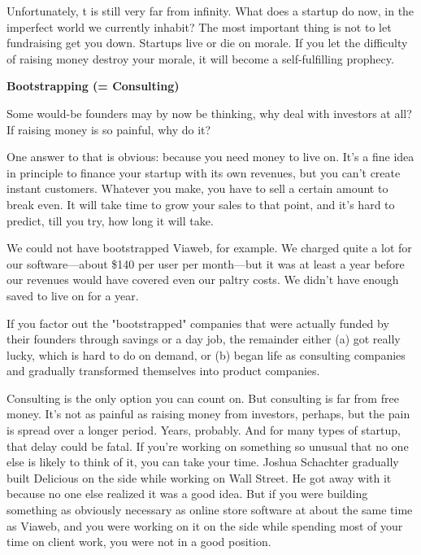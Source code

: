 Unfortunately,
                    t is still very far from infinity. What does a startup do
                    now, in the imperfect world we currently inhabit? The most
                    important thing is not to let fundraising get you down.
                    Startups live or die on morale. If you let the difficulty of
                    raising money destroy your morale, it will become a
                    self-fulfilling prophecy.


                    \textbf{Bootstrapping (= Consulting)}

Some would-be
                    founders may by now be thinking, why deal with investors at
                    all? If raising money is so painful, why do it?

One
                    answer to that is obvious: because you need money to live
                    on. It's a fine idea in principle to finance your startup
                    with its own revenues, but you can't create instant
                    customers. Whatever you make, you have to sell a certain
                    amount to break even. It will take time to grow your sales
                    to that point, and it's hard to predict, till you try, how
                    long it will take.

We could not have bootstrapped
                    Viaweb, for example. We charged quite a lot for our
                    software---about \$140 per user per month---but it
                    was at least a year before our revenues would have covered
                    even our paltry costs. We didn't have enough saved to live
                    on for a year.

If you factor out the
                    "bootstrapped" companies that were actually funded by their
                    founders through savings or a day job, the remainder either
                    (a) got really lucky, which is hard to do on demand, or (b)
                    began life as consulting companies and gradually transformed
                    themselves into product companies.

Consulting is
                    the only option you can count on. But consulting is far from
                    free money. It's not as painful as raising money from
                    investors, perhaps, but the pain is spread over a longer
                    period. Years, probably. And for many types of startup, that
                    delay could be fatal. If you're working on something so
                    unusual that no one else is likely to think of it, you can
                    take your time. Joshua Schachter gradually built Delicious
                    on the side while working on Wall Street. He got away with
                    it because no one else realized it was a good idea. But if
                    you were building something as obviously necessary as online
                    store software at about the same time as Viaweb, and you
                    were working on it on the side while spending most of your
                    time on client work, you were not in a good position.

